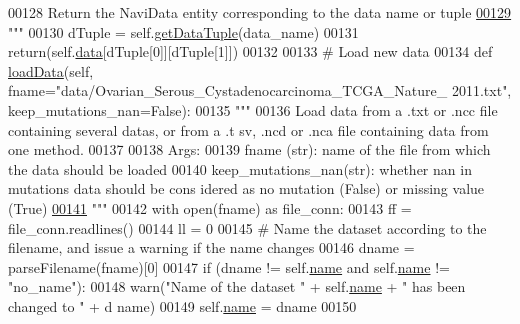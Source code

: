 \begin{DoxyCode}
00128 \textcolor{stringliteral}{        Return the NaviData entity corresponding to the data name or tuple}
\hypertarget{navicom_8py_source_l00129}{}\hyperlink{classnavicom_1_1navicom_1_1NaviCom_ad675e899836271ff4f2fd4bd17ea81d9}{00129} \textcolor{stringliteral}{        """}
00130         dTuple = self.\hyperlink{classnavicom_1_1navicom_1_1NaviCom_ad8ac5b74afb4ceb6ed094604787d4d19}{getDataTuple}(data\_name)
00131         \textcolor{keywordflow}{return}(self.\hyperlink{classnavicom_1_1navicom_1_1NaviCom_aa1abff245573ed8406c6bddb4596f093}{data}[dTuple[0]][dTuple[1]])
00132 
00133     \textcolor{comment}{# Load new data}
00134     \textcolor{keyword}{def }\hyperlink{classnavicom_1_1navicom_1_1NaviCom_a10e8b8a4c06b4ecf09366ca6b69efff6}{loadData}(self, fname="data/Ovarian\_Serous\_Cystadenocarcinoma\_TCGA\_Nature\_
      2011.txt", keep\_mutations\_nan=False):
00135         \textcolor{stringliteral}{"""}
00136 \textcolor{stringliteral}{        Load data from a .txt or .ncc file containing several datas, or from a .t
      sv, .ncd or .nca file containing data from one method.}
00137 \textcolor{stringliteral}{}
00138 \textcolor{stringliteral}{        Args:}
00139 \textcolor{stringliteral}{            fname (str): name of the file from which the data should be loaded}
00140 \textcolor{stringliteral}{            keep\_mutations\_nan(str): whether nan in mutations data should be cons
      idered as no mutation (False) or missing value (True)}
\hypertarget{navicom_8py_source_l00141}{}\hyperlink{classnavicom_1_1navicom_1_1NaviCom_a10e8b8a4c06b4ecf09366ca6b69efff6}{00141} \textcolor{stringliteral}{        """}
00142         with open(fname) \textcolor{keyword}{as} file\_conn:
00143             ff = file\_conn.readlines()
00144             ll = 0
00145         \textcolor{comment}{# Name the dataset according to the filename, and issue a warning if the 
      name changes}
00146         dname = parseFilename(fname)[0]
00147         \textcolor{keywordflow}{if} (dname != self.\hyperlink{classnavicom_1_1navicom_1_1NaviCom_a950e5ebf199edea40d55c506b8aaf134}{name} \textcolor{keywordflow}{and} self.\hyperlink{classnavicom_1_1navicom_1_1NaviCom_a950e5ebf199edea40d55c506b8aaf134}{name} != \textcolor{stringliteral}{"no\_name"}):
00148             warn(\textcolor{stringliteral}{"Name of the dataset "} + self.\hyperlink{classnavicom_1_1navicom_1_1NaviCom_a950e5ebf199edea40d55c506b8aaf134}{name} + \textcolor{stringliteral}{" has been changed to "} + d
      name)
00149         self.\hyperlink{classnavicom_1_1navicom_1_1NaviCom_a950e5ebf199edea40d55c506b8aaf134}{name} = dname
00150 

\end{DoxyCode}
